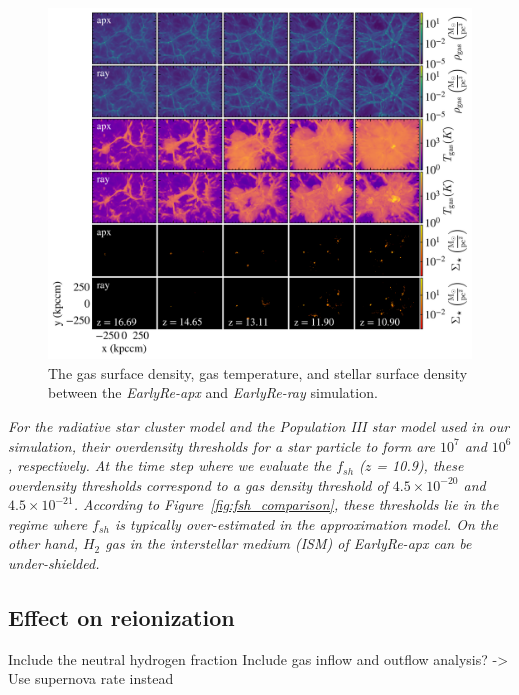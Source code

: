 \documentclass[linenumbers, twocolumn]{aastex631}
\begin{document}
\begin{figure}
    \centering
    \includegraphics[width=\textwidth]{EarlyRe/gas_star_surface_density_multiple.png}
    \caption{The gas surface density, gas temperature, and stellar surface density between the \textit{EarlyRe-apx} and \textit{EarlyRe-ray} simulation.}
    \label{fig:gas_star_surface_density_194}
\end{figure}

\textit{For the radiative star cluster model and the Population III star model used in our simulation, their overdensity thresholds for a star particle to form are $10^{7}$ and $10^{6}$, respectively. At the time step where we evaluate the $f_{sh}$ ($z$ = 10.9), these overdensity thresholds correspond to a gas density threshold of $4.5\times 10^{-20}$ and $4.5\times 10^{-21}$. According to Figure~\ref{fig:fsh_comparison}, these thresholds lie in the regime where $f_{sh}$ is typically over-estimated in the approximation model. On the other hand, $H_{2}$ gas in the interstellar medium (ISM) of \textit{EarlyRe-apx} can be under-shielded.} 



\subsection{Effect on reionization}
Include the neutral hydrogen fraction 
Include gas inflow and outflow analysis? -> Use supernova rate instead
\end{document}
